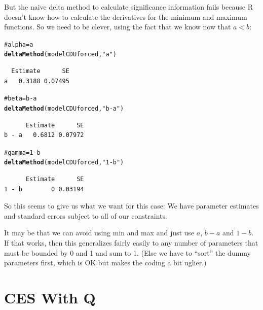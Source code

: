 \documentclass[10pt]{article}\usepackage{graphicx, color}
\makeatletter
\newcommand{\hlfunctioncall}[1]{\textcolor[rgb]{0.501960784313725,0,0.329411764705882}{\textbf{#1}}}%
\newcommand{\hlstring}[1]{\textcolor[rgb]{0.6,0.6,1}{#1}}%
\newcommand{\hlcomment}[1]{\textcolor[rgb]{0.180392156862745,0.6,0.341176470588235}{#1}}%
\newenvironment{kframe}{%
 \def\at@end@of@kframe{}%
 \ifinner\ifhmode%
  \def\at@end@of@kframe{\end{minipage}}%
  \begin{minipage}{\columnwidth}%
 \fi\fi%
 \def\FrameCommand##1{\hskip\@totalleftmargin \hskip-\fboxsep
 \colorbox{shadecolor}{##1}\hskip-\fboxsep
     \hskip-\linewidth \hskip-\@totalleftmargin \hskip\columnwidth}%
 \MakeFramed {\advance\hsize-\width
   \@totalleftmargin\z@ \linewidth\hsize
   \@setminipage}}%
 {\par\unskip\endMakeFramed%
 \at@end@of@kframe}
\newenvironment{knitrout}{}{} %
\makeatother
\begin{document}
But the naive delta method to calculate significance information fails because R doesn't know how to calculate the derivatives for the minimum and maximum functions.  So we need to be clever, using the fact that we know now that $a < b$:
\begin{knitrout}
\color{fgcolor}\begin{kframe}
\begin{alltt}
\hlcomment{# alpha = a}
\hlfunctioncall{deltaMethod}( modelCDUforced, \hlstring{"a"})
\end{alltt}
\begin{verbatim}
  Estimate      SE
a   0.3188 0.07495
\end{verbatim}
\begin{alltt}
\hlcomment{# beta = b - a}
\hlfunctioncall{deltaMethod}( modelCDUforced, \hlstring{"b-a"})
\end{alltt}
\begin{verbatim}
      Estimate      SE
b - a   0.6812 0.07972
\end{verbatim}
\begin{alltt}
\hlcomment{# gamma = 1-b}
\hlfunctioncall{deltaMethod}( modelCDUforced, \hlstring{"1-b"})
\end{alltt}
\begin{verbatim}
      Estimate      SE
1 - b        0 0.03194
\end{verbatim}
\end{kframe}
\end{knitrout}


So this seems to give us what we want for this case:  We have parameter estimates and standard errors subject to all of our constraints.  

It may be that we can avoid using min and max and just
use $a$, $b-a$ and $1-b$.  If that works, then this generalizes fairly easily to any number of parameters that must be bounded by 0 and 1 and sum to 1.  (Else we have to ``sort'' the dummy parameters first, which is OK but makes the coding a bit uglier.)

\section{CES With Q}
\end{document}
